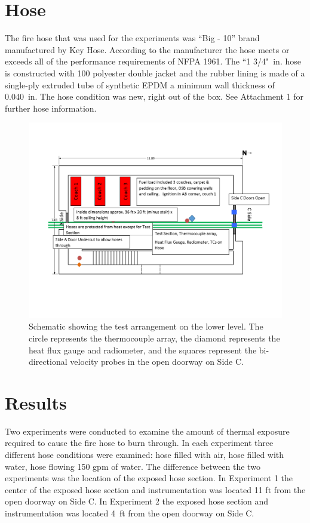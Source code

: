 \documentclass[letterpaper,11pt]{texMemo} %
\begin{document}
\section{Hose}
The fire hose that was used for the experiments was ``Big - 10'' brand manufactured by Key Hose. According to the manufacturer the hose meets or exceeds all of the performance requirements of NFPA 1961. The ``1 3/4"~in. hose is constructed with 100 polyester double jacket and the rubber lining is made of a single-ply extruded tube of synthetic EPDM a minimum wall thickness of 0.040~in. The hose condition was new, right out of the box. See Attachment 1 for further hose information.

\begin{figure}[!ht]
\centering
\includegraphics[width=.8\columnwidth]{../Figures/Hose_Figures/test_plan}
\caption{Schematic showing the test arrangement on the lower level. The circle represents the thermocouple array, the diamond represents the heat flux gauge and radiometer, and the squares represent the bi-directional velocity probes in the open doorway on Side C.}
\label{fig:test_plan}
\end{figure}

\section{Results}
Two experiments were conducted to examine the amount of thermal exposure required to cause the fire hose to burn through. In each experiment three different hose conditions were examined: hose filled with air, hose filled with water, hose flowing 150 gpm of water. The difference between the two experiments was the location of the exposed hose section. In Experiment 1 the center of the exposed hose section and instrumentation was located 11 ft from the open doorway on Side C. In Experiment 2 the exposed hose section and instrumentation was located 4~ft from the open doorway on Side C.  
\end{document}
